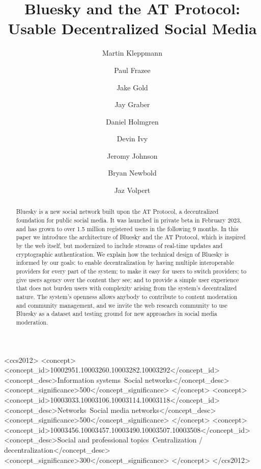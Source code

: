 \documentclass[sigconf,review]{acmart}
\begin{document}
\title{Bluesky and the AT Protocol: Usable Decentralized Social Media}
\author{Martin Kleppmann}

\author{Paul Frazee} %
\author{Jake Gold} %
\author{Jay Graber} %
\author{Daniel Holmgren} %
\author{Devin Ivy} %
\author{Jeromy Johnson} %
\author{Bryan Newbold} %
\author{Jaz Volpert} %

\begin{abstract}
    Bluesky is a new social network built upon the AT Protocol, a decentralized foundation for public social media.
    It was launched in private beta in February 2023, and has grown to over 1.5 million registered users in the following 9 months.
    In this paper we introduce the architecture of Bluesky and the AT Protocol, which is inspired by the web itself, but modernized to include streams of real-time updates and cryptographic authentication.
    We explain how the technical design of Bluesky is informed by our goals: to enable decentralization by having multiple interoperable providers for every part of the system; to make it easy for users to switch providers; to give users agency over the content they see; and to provide a simple user experience that does not burden users with complexity arising from the system's decentralized nature.
    The system's openness allows anybody to contribute to content moderation and community management, and we invite the web research community to use Bluesky as a dataset and testing ground for new approaches in social media moderation.
\end{abstract}

\begin{CCSXML}
<ccs2012>
   <concept>
       <concept_id>10002951.10003260.10003282.10003292</concept_id>
       <concept_desc>Information systems~Social networks</concept_desc>
       <concept_significance>500</concept_significance>
   </concept>
   <concept>
       <concept_id>10003033.10003106.10003114.10003118</concept_id>
       <concept_desc>Networks~Social media networks</concept_desc>
       <concept_significance>500</concept_significance>
   </concept>
   <concept>
       <concept_id>10003456.10003457.10003490.10003507.10003508</concept_id>
       <concept_desc>Social and professional topics~Centralization / decentralization</concept_desc>
       <concept_significance>300</concept_significance>
   </concept>
 </ccs2012>
\end{CCSXML}
\end{document}
